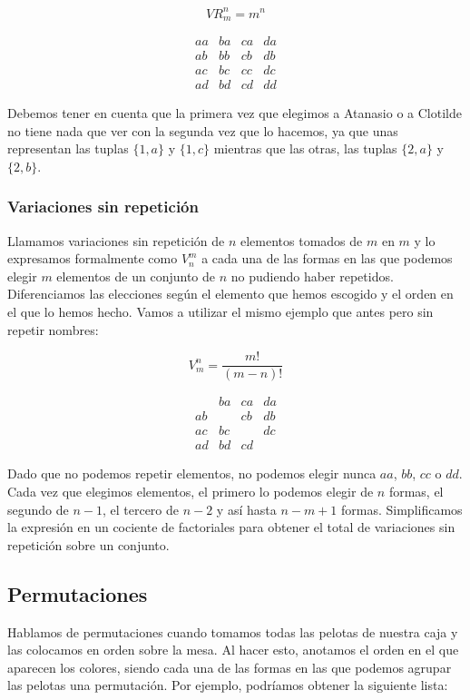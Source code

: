 \[VR_{m}^{n} = m^n\]

\[
\begin{array}{cccc}
	aa & ba & ca & da \\
	ab & bb & cb & db \\
	ac & bc & cc & dc \\
	ad & bd & cd & dd
\end{array}
\]

Debemos tener en cuenta que la primera vez que elegimos a Atanasio o a Clotilde no tiene nada que ver con la segunda vez que lo hacemos, ya que unas representan las tuplas $\{1,a\}$ y $\{1,c\}$ mientras que las otras, las tuplas $\{2,a\}$ y $\{2,b\}$.

\subsubsection{Variaciones sin repetición}

Llamamos variaciones sin repetición de $n$ elementos tomados de $m$ en $m$ y lo expresamos formalmente como $V_{n}^{m}$ a cada una de las formas en las que podemos elegir $m$ elementos de un conjunto de $n$ no pudiendo haber repetidos.
Diferenciamos las elecciones según el elemento que hemos escogido y el orden en el que lo hemos hecho.
Vamos a utilizar el mismo ejemplo que antes pero sin repetir nombres:

\[V_{m}^{n} = \frac{m!}{(m-n)!}\]

\[
\begin{array}{cccc}
	   & ba & ca & da \\
	ab &    & cb & db \\
	ac & bc &    & dc \\
	ad & bd & cd &
\end{array}
\]

Dado que no podemos repetir elementos, no podemos elegir nunca $aa$, $bb$, $cc$ o $dd$.
Cada vez que elegimos elementos, el primero lo podemos elegir de $n$ formas, el segundo de $n - 1$, el tercero de $n - 2$ y así hasta $n - m + 1$ formas.
Simplificamos la expresión en un cociente de factoriales para obtener el total de variaciones sin repetición sobre un conjunto.

\subsection{Permutaciones}\label{permutaciones}

Hablamos de permutaciones cuando tomamos todas las pelotas de nuestra caja y las colocamos en orden sobre la mesa.
Al hacer esto, anotamos el orden en el que aparecen los colores, siendo cada una de las formas en las que podemos agrupar las pelotas una permutación.
Por ejemplo, podríamos obtener la siguiente lista:

